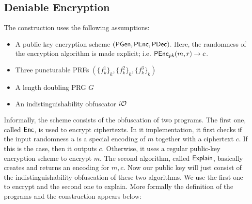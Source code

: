 \subsection{Deniable Encryption}
The construction uses the following assumptions:
\begin{itemize}
\item A public key encryption scheme $(\mathsf{PGen},\mathsf{PEnc},\mathsf{PDec})$. Here, the randomness of the encryption algorithm is made explicit; i.e. $\mathsf{PEnc}_{pk}(m,r)\to c$.
\item Three puncturable PRFs $(\{f_k^1\}_k,\{f_k^2\}_k,\{f_k^3\}_k)$
\item A length doubling PRG $G$
\item An indistinguishability obfuscator $i\mathcal{O}$
\end{itemize}

Informally, the scheme consists of the obfuscation of two programs. The first one, called $\mathsf{Enc}$, is used to encrypt ciphertexts. In it implementation, it first checks if the input randomness $u$ is a special encoding of $m$ together with a ciphertext $c$. If this is the case, then it outputs $c$. Otherwise, it uses a regular public-key encryption scheme to encrypt $m$. The second algorithm, called $\mathsf{Explain}$, basically creates and returns an encoding for $m,c$. Now our public key will just consist of the indistinguishability obfuscation of these two algorithms. We use the first one to encrypt and the second one to explain. More formally the definition of the programs and the construction appears below:

\begin{figure}[h]
\centering
{}
\end{figure}

